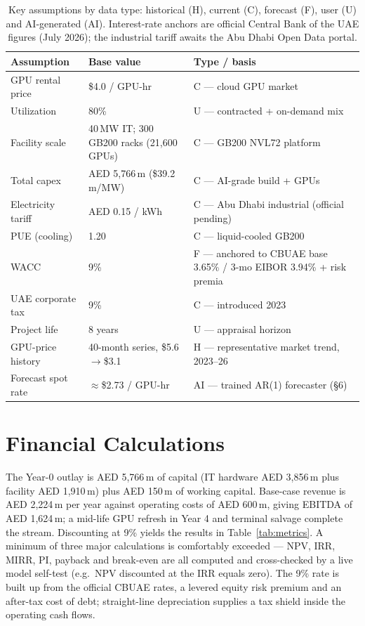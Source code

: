 \documentclass[12pt,a4paper]{article}
\begin{document}
\begin{table}[h]
\small
\begin{tabularx}{\textwidth}{@{}l p{4.3cm} X@{}}
\toprule
\textbf{Assumption} & \textbf{Base value} & \textbf{Type / basis}\\
\midrule
GPU rental price & \$4.0 / GPU-hr & C --- cloud GPU market\\
Utilization & 80\% & U --- contracted + on-demand mix\\
Facility scale & 40\,MW IT; 300 GB200 racks (21{,}600 GPUs) & C --- GB200 NVL72 platform\\
Total capex & AED 5{,}766\,m (\$39.2\,m/MW) & C --- AI-grade build + GPUs\\
Electricity tariff & AED 0.15 / kWh & C --- Abu Dhabi industrial (official pending)\\
PUE (cooling) & 1.20 & C --- liquid-cooled GB200\\
WACC & 9\% & F --- anchored to CBUAE base 3.65\% / 3-mo EIBOR 3.94\% + risk premia\\
UAE corporate tax & 9\% & C --- introduced 2023\\
Project life & 8 years & U --- appraisal horizon\\
GPU-price history & 40-month series, \$5.6$\to$\$3.1 & H --- representative market trend, 2023--26\\
Forecast spot rate & $\approx$\$2.73 / GPU-hr & AI --- trained AR(1) forecaster (§6)\\
\bottomrule
\end{tabularx}
\caption{Key assumptions by data type: historical (H), current (C), forecast (F), user (U) and
AI-generated (AI). Interest-rate anchors are official Central Bank of the UAE figures (July 2026);
the industrial tariff awaits the Abu Dhabi Open Data portal.}
\end{table}

\section{Financial Calculations}
The Year-0 outlay is AED 5{,}766\,m of capital (IT hardware AED 3{,}856\,m plus facility
AED 1{,}910\,m) plus AED 150\,m of working capital. Base-case revenue is AED 2{,}224\,m per year
against operating costs of AED 600\,m, giving EBITDA of AED 1{,}624\,m; a mid-life GPU refresh in
Year 4 and terminal salvage complete the stream. Discounting at 9\% yields the results in
Table~\ref{tab:metrics}. A minimum of three major calculations is comfortably exceeded --- NPV,
IRR, MIRR, PI, payback and break-even are all computed and cross-checked by a live model
self-test (e.g.\ NPV discounted at the IRR equals zero). The 9\% rate is built up from the official
CBUAE rates, a levered equity risk premium and an after-tax cost of debt; straight-line
depreciation supplies a tax shield inside the operating cash flows.
\end{document}
